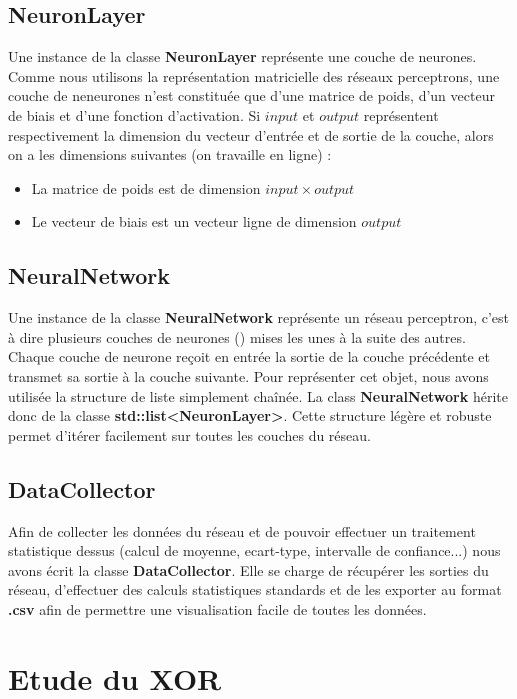 \subsection{NeuronLayer}

Une instance de la classe \textbf{NeuronLayer} représente une couche de neurones. Comme nous utilisons la représentation matricielle des réseaux perceptrons, une couche de neneurones n'est constituée que d'une matrice de poids, d'un vecteur de biais et d'une fonction d'activation. Si $input$ et $output$ représentent respectivement la dimension du vecteur d'entrée et de sortie de la couche, alors on a les dimensions suivantes (on travaille en ligne) :
\begin{itemize}
	\item La matrice de poids est de dimension $input \times output$
	\item Le vecteur de biais est un vecteur ligne de dimension $output$
\end{itemize}
\subsection{NeuralNetwork}

Une instance de la classe \textbf{NeuralNetwork} représente un réseau perceptron, c'est à dire plusieurs couches de neurones () mises les unes à la suite des autres. Chaque couche de neurone reçoit en entrée la sortie de la couche précédente et transmet sa sortie à la couche suivante. 
Pour représenter cet objet, nous avons utilisée la structure de liste simplement chaînée. La class \textbf{NeuralNetwork} hérite donc de la classe \textbf{std::list<NeuronLayer>}. Cette structure légère et robuste permet d'itérer facilement sur toutes les couches du réseau. 

\subsection{DataCollector}

Afin de collecter les données du réseau et de pouvoir effectuer un traitement statistique dessus (calcul de moyenne, ecart-type, intervalle de confiance...) nous avons écrit la classe \textbf{DataCollector}. Elle se charge de récupérer les sorties du réseau, d'effectuer des calculs statistiques standards et de les exporter au format \textbf{.csv} afin de permettre une visualisation facile de toutes les données.

\section{Etude du XOR}

